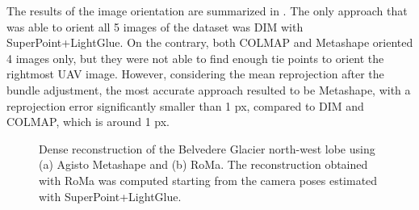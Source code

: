 The results of the image orientation are summarized in .
The only approach that was able to orient all 5 images of the dataset was DIM with SuperPoint+LightGlue. 
On the contrary, both COLMAP and Metashape oriented 4 images only, but they were not able to find enough tie points to orient the rightmost UAV image.
However, considering the mean reprojection after the bundle adjustment, the most accurate approach resulted to be Metashape, with a reprojection error significantly smaller than 1 px, compared to DIM and COLMAP, which is around 1 px. 

\begin{figure}[h!]
  \centering
  \caption{Dense reconstruction of the Belvedere Glacier north-west lobe using (a) Agisto Metashape and (b) RoMa. The reconstruction obtained with RoMa was computed starting from the camera poses estimated with SuperPoint+LightGlue.}
  \label{fig:5:winter_res}
\end{figure}

